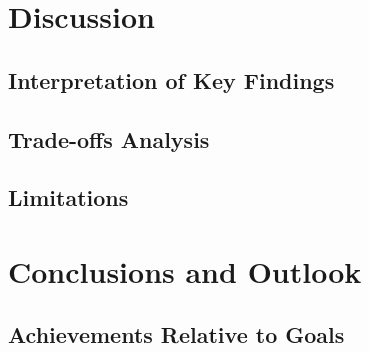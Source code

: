 \newpage
\section{Discussion}

\subsection{Interpretation of Key Findings}

\subsection{Trade-offs Analysis}

\subsection{Limitations}

\newpage
\section{Conclusions and Outlook}

\subsection{Achievements Relative to Goals}

